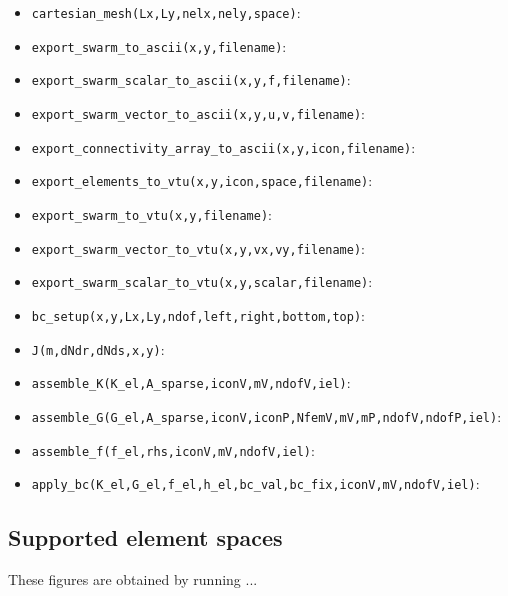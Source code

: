 \begin{itemize}
\begin{itemize}
\item \lstinline{cartesian_mesh(Lx,Ly,nelx,nely,space)}:
\item \lstinline{export_swarm_to_ascii(x,y,filename)}:
\item \lstinline{export_swarm_scalar_to_ascii(x,y,f,filename)}:
\item \lstinline{export_swarm_vector_to_ascii(x,y,u,v,filename)}:
\item \lstinline{export_connectivity_array_to_ascii(x,y,icon,filename)}:
\item \lstinline{export_elements_to_vtu(x,y,icon,space,filename)}:
\item \lstinline{export_swarm_to_vtu(x,y,filename)}:
\item \lstinline{export_swarm_vector_to_vtu(x,y,vx,vy,filename)}:
\item \lstinline{export_swarm_scalar_to_vtu(x,y,scalar,filename)}:
\item \lstinline{bc_setup(x,y,Lx,Ly,ndof,left,right,bottom,top)}:
\item \lstinline{J(m,dNdr,dNds,x,y)}:
\item \lstinline{assemble_K(K_el,A_sparse,iconV,mV,ndofV,iel)}:
\item \lstinline{assemble_G(G_el,A_sparse,iconV,iconP,NfemV,mV,mP,ndofV,ndofP,iel)}:
\item \lstinline{assemble_f(f_el,rhs,iconV,mV,ndofV,iel)}:
\item \lstinline{apply_bc(K_el,G_el,f_el,h_el,bc_val,bc_fix,iconV,mV,ndofV,iel)}:
\end{itemize}

\end{itemize}

\newpage
\subsection*{Supported element spaces}

These figures are obtained by running ...

